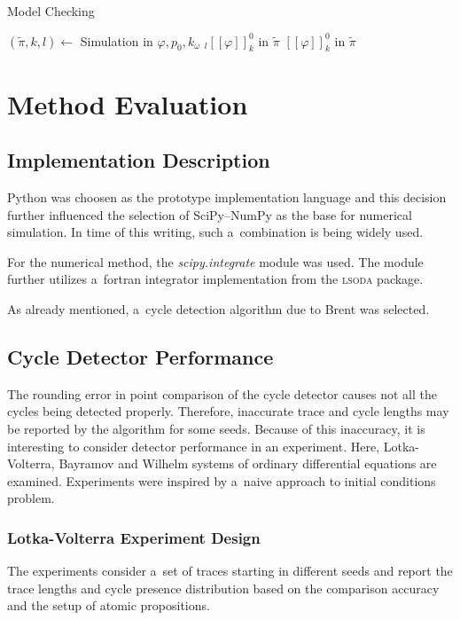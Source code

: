 \documentclass[12pt,twoside,draft]{fithesis}
\begin{document}
\begin{algorithm}
	\caption{Model Checking}
	\label{modelChecking}
	\begin{algorithmic}[1]
		\STATE $(\tilde{\pi},k,l)\leftarrow$ Simulation in $\varphi, p_0, k_\omega$
			\RETURN ${}_l[[\varphi]]_k^0$ in $\tilde{\pi}$ 
		\ELSE
			\RETURN $[[\varphi]]_k^0$ in $\tilde{\pi}$ 
		\ENDIF
	\end{algorithmic}
\end{algorithm}

\chapter{Method Evaluation}
\section{Implementation Description}
Python was choosen as the prototype implementation language and this
decision further influenced the selection of SciPy--NumPy as the base
for numerical simulation. In time of this writing, such a~combination
is being widely used\cite{wiki:python}.

For the numerical method, the \emph{scipy.integrate} module was used.
The module further utilizes a~fortran integrator implementation from
the \textsc{lsoda} package\cite{scipy:odeint}. 

As already mentioned, a~cycle detection algorithm due to Brent was
selected.

\section{Cycle Detector Performance}
The rounding error in point comparison of the cycle detector causes
not all the cycles being detected properly. Therefore, inaccurate trace
and cycle lengths may be reported by the algorithm for some seeds.
Because of this inaccuracy, it is interesting to consider detector
performance in an experiment. Here, Lotka-Volterra, Bayramov and Wilhelm
systems of ordinary differential equations are examined. Experiments
were inspired by a~naive approach to initial conditions
problem\cite{sven}.

\subsection*{Lotka-Volterra Experiment Design}
The experiments consider a~set of traces starting in different seeds
and report the trace lengths and cycle presence distribution based
on the comparison accuracy and the setup of atomic propositions.
\end{document}
